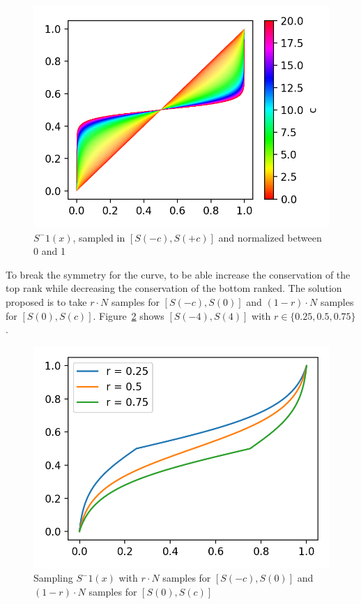 \begin{figure}
  \centering
  \includegraphics[width=\linewidth]{img/s_curve_c.png}
  \caption{$S^-1(x)$, sampled in $\left[S(-c), S(+c)\right]$ and normalized between 0 and 1}
  \label{fig:s_curve_c}
\end{figure}

To break the symmetry for the curve, to be able increase the conservation of the top rank while decreasing the conservation of the bottom ranked. The solution proposed is to take $r \cdot N$ samples for $\left[S(-c), S(0)\right]$ and $(1-r) \cdot N$ samples for $\left[S(0), S(c)\right]$. Figure~\ref{fig:s_curve_r} shows $\left[S(-4), S(4)\right]$ with $r \in \{0.25, 0.5, 0.75\}$.

\begin{figure}
  \includegraphics[width=\linewidth]{img/s_curve_r.png}
  \caption{Sampling $S^-1(x)$ with $r \cdot N$ samples for $\left[S(-c), S(0)\right]$ and $(1-r) \cdot N$ samples for $\left[S(0), S(c)\right]$}
  \label{fig:s_curve_r}
\end{figure}


